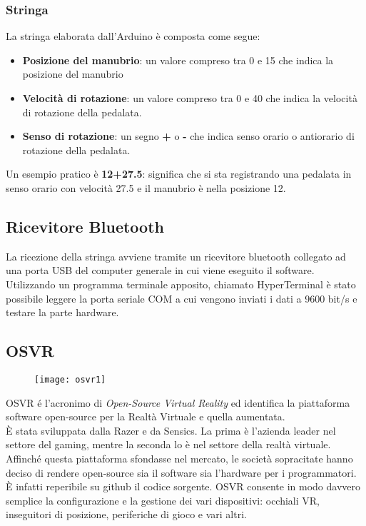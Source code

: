\subsubsection{Stringa}
La stringa elaborata dall'Arduino è composta come segue:
\begin{itemize}
  \item \textbf{Posizione del manubrio}: un valore compreso tra 0 e 15 che indica la posizione del manubrio
  \item \textbf{Velocità di rotazione}: un valore compreso tra 0 e 40 che indica la velocità di rotazione della pedalata.
  \item \textbf{Senso di rotazione}: un segno \textbf{+} o \textbf{-} che indica senso orario o antiorario di rotazione della pedalata.
\end{itemize}

\noindent Un esempio pratico è \textbf{12+27.5}: significa che si sta registrando una pedalata in senso orario con velocità 27.5 e il manubrio è nella posizione 12.

\subsection{Ricevitore Bluetooth}
La ricezione della stringa avviene tramite un ricevitore bluetooth collegato ad una porta USB del computer generale in cui viene eseguito il software. Utilizzando un programma terminale apposito, chiamato HyperTerminal è stato possibile leggere la porta seriale COM a cui vengono inviati i dati a 9600 bit/s e testare la parte hardware.
\subsection{OSVR}
\begin{figure}[htb]
    \centering
    \vspace{-0.7cm}
    \texttt{[image: osvr1]}
    \vspace{-0.3cm}
\end{figure}
\noindent OSVR é l'acronimo di \textit{Open-Source Virtual Reality} ed identifica la piattaforma software open-source per la Realtà Virtuale e quella aumentata. \\È stata sviluppata dalla Razer e da Sensics. La prima è l'azienda leader nel settore del gaming, mentre la seconda lo è nel settore della realtà virtuale. Affinché questa piattaforma sfondasse nel mercato, le società sopracitate hanno deciso di rendere open-source sia il software sia l'hardware per i programmatori. È infatti reperibile su github il codice sorgente. OSVR consente in modo davvero semplice la configurazione e la gestione dei vari dispositivi: occhiali VR, inseguitori di posizione, periferiche di gioco e vari altri. 
